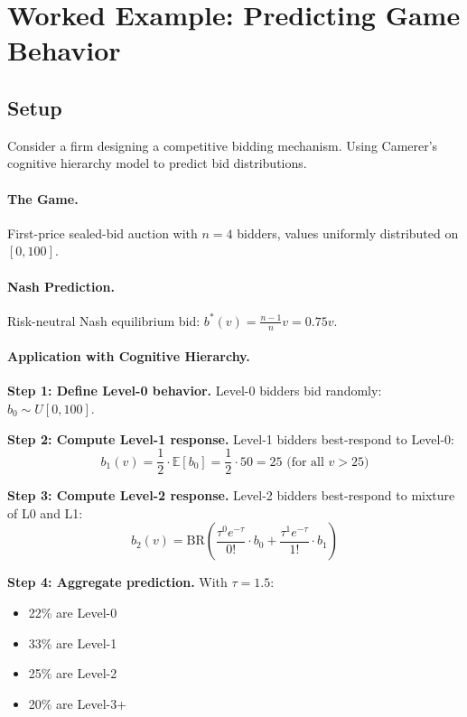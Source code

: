 \section{Worked Example: Predicting Game Behavior}
\label{sec:ca-example}

\subsection{Setup}
Consider a firm designing a competitive bidding mechanism. Using Camerer's cognitive hierarchy model to predict bid distributions.

\paragraph{The Game.} First-price sealed-bid auction with $n = 4$ bidders, values uniformly distributed on $[0, 100]$.

\paragraph{Nash Prediction.} Risk-neutral Nash equilibrium bid: $b^*(v) = \frac{n-1}{n} v = 0.75v$.

\paragraph{Application with Cognitive Hierarchy.}

\textbf{Step 1: Define Level-0 behavior.}
Level-0 bidders bid randomly: $b_0 \sim U[0, 100]$.

\textbf{Step 2: Compute Level-1 response.}
Level-1 bidders best-respond to Level-0:
\begin{equation}
b_1(v) = \frac{1}{2} \cdot \mathbb{E}[b_0] = \frac{1}{2} \cdot 50 = 25 \text{ (for all } v > 25\text{)}
\end{equation}

\textbf{Step 3: Compute Level-2 response.}
Level-2 bidders best-respond to mixture of L0 and L1:
\begin{equation}
b_2(v) = \text{BR}\left(\frac{\tau^0 e^{-\tau}}{0!} \cdot b_0 + \frac{\tau^1 e^{-\tau}}{1!} \cdot b_1\right)
\end{equation}

\textbf{Step 4: Aggregate prediction.}
With $\tau = 1.5$:
\begin{itemize}[nosep]
\item 22\% are Level-0
\item 33\% are Level-1
\item 25\% are Level-2
\item 20\% are Level-3+
\end{itemize}

